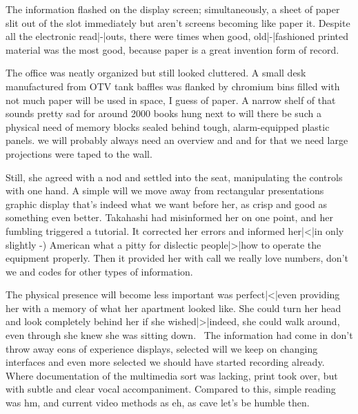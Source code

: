 \StopIdea

\StartIdea
    [ title={Arthur Clarke},
     remark={2001, A space Odyssey, p. 132, 1968}]

The information flashed on the display screen; simultaneously, a sheet of paper
slit out of the slot immediately  {but aren't screens becoming
like paper} it. Despite all the electronic read|-|outs, there were times when
good, old|-|fashioned printed material was the most  {good,
because paper is a great invention} form of record.

\StopIdea

\StartIdea
    [ title={Greg Bear},
     remark={Eon, p. 30, 1985}]

The office was neatly organized but still looked cluttered. A small desk
manufactured from OTV tank baffles was flanked by chromium bins filled with
 {not much paper will be used in space, I guess} of paper. A
narrow shelf of  {that sounds pretty sad for around 2000} books
hung next to  {will there be such a physical need} of memory
blocks sealed behind tough, alarm-equipped plastic panels.  {we
will probably always need an overview} and  {and for that we
need large projections} were taped to the wall.

\StopIdea

\StartIdea
    [ title={Greg Bear},
     remark={Eon, p. 132, 1985}]

Still, she agreed with a nod and settled into the seat, manipulating the controls
with one hand. A simple  {will we move away from rectangular
presentations} graphic display  {that's indeed what we want}
before her, as crisp and  {good} as something 
{even better}. Takahashi had misinformed her on one point, and her fumbling
triggered a tutorial. It corrected her errors and informed her|<|in only slightly
 {-)} American  {what a pitty for dislectic
people}|>|how to operate the equipment properly. Then it provided her with call
 {we really love numbers, don't we} and codes for other types of
information.

\StopIdea

\StartIdea
    [ title={Greg Bear},
     remark={Eon, pp. 132/135, 1985}]

The  {physical presence will become less important} was
perfect|<|even providing her with a memory of what her apartment looked like. She
could turn her head and look completely behind her if she wished|>|indeed, she
could walk around, even through she knew she was sitting down. \unknown\ The
information had come in  {don't throw away eons of experience}
displays, selected  {will we keep on changing interfaces} and
even more selected  {we should have started recording already}.
Where documentation of the multimedia sort was lacking, print took over, but with
subtle and clear vocal accompaniment. Compared to this, simple reading was
 {hm, \unknown} and current video methods as 
{eh, \unknown} as cave  {let's be humble then}.

